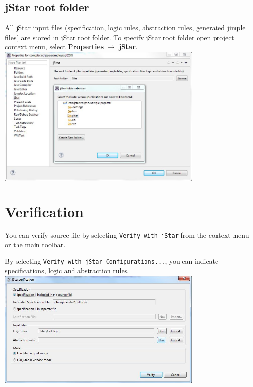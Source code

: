 \documentclass{article}
\begin{document}
\subsection{jStar root folder}
\label{sec:jstarrootfolder}

All jStar input files (specification, logic rules, abstraction rules, generated jimple files) are stored in jStar root folder. To specify jStar root folder open project context menu, select {\bf Properties} $\rightarrow$ {\bf jStar}.\\

\includegraphics[width=4in]{images/rootFolder.jpg}

\section{Verification}
You can verify source file by selecting \texttt{Verify with jStar} from the context menu or the main toolbar. 

By selecting \texttt{Verify with jStar Configurations...}, you can indicate specifications, logic and abstraction rules.\\ 

\includegraphics[width=4in]{images/verificationWindow.jpg}\\
\end{document}
